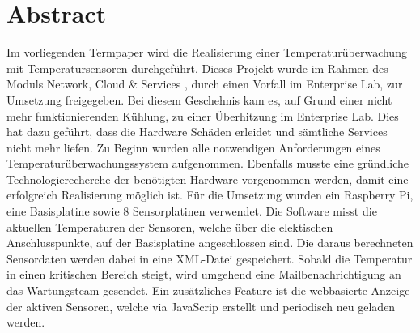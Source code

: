 \section*{Abstract}
Im vorliegenden Termpaper wird die Realisierung einer Temperaturüberwachung mit Temperatursensoren durchgeführt. Dieses Projekt  wurde im Rahmen des Moduls \grqq{}Network, Cloud \& Services\glqq{} , durch einen Vorfall im Enterprise Lab, zur Umsetzung freigegeben. Bei diesem Geschehnis kam es, auf Grund einer nicht mehr funktionierenden Kühlung, zu einer Überhitzung im Enterprise Lab. Dies hat dazu geführt, dass die Hardware Schäden erleidet und sämtliche Services nicht mehr liefen.
Zu Beginn wurden alle notwendigen Anforderungen eines Temperaturüberwachungssystem aufgenommen. Ebenfalls musste eine gründliche Technologierecherche der benötigten Hardware vorgenommen werden, damit eine erfolgreich Realisierung möglich ist.
Für die Umsetzung wurden ein Raspberry Pi, eine Basisplatine sowie 8 Sensorplatinen verwendet. Die Software misst die aktuellen Temperaturen der Sensoren, welche über die elektischen Anschlusspunkte, auf der Basisplatine angeschlossen sind. Die daraus berechneten Sensordaten werden dabei in eine XML-Datei gespeichert. Sobald die Temperatur in einen kritischen Bereich steigt, wird umgehend eine Mailbenachrichtigung an das Wartungsteam gesendet. Ein zusätzliches Feature ist die webbasierte Anzeige der aktiven Sensoren, welche via JavaScrip erstellt und periodisch neu geladen werden.
 
\clearpage